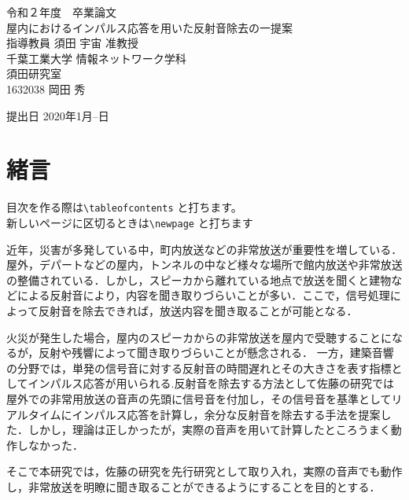 \documentclass[a4j,12pt]{jarticle}
\begin{document}
\begin{center}
\thispagestyle{empty}
\vspace*{5zh}
\huge
令和２年度　卒業論文\\[50pt]
{\Huge 屋内におけるインパルス応答を用いた反射音除去の一提案}\\
[80pt]
\huge
指導教員 須田 宇宙 准教授\\[30pt]
千葉工業大学 情報ネットワーク学科\\[10pt]
須田研究室\\[60pt]
1632038 \hspace{70pt} 岡田 秀\\[75pt]
\end{center}
\vspace*{-2cm}
\begin{flushright} 
\huge
提出日 2020年1月--日
\end{flushright}

\newpage
{}
\tableofcontents
\newpage
{}
\section{緒言}
目次を作る際は\verb+\tableofcontents+ と打ちます。\\
新しいページに区切るときは\verb+\newpage+ と打ちます

近年，災害が多発している中，町内放送などの非常放送が重要性を増している．屋外，デパートなどの屋内，トンネルの中など様々な場所で館内放送や非常放送の整備されている．しかし，スピーカから離れている地点で放送を聞くと建物などによる反射音により，内容を聞き取りづらいことが多い．ここで，信号処理によって反射音を除去できれば，放送内容を聞き取ることが可能となる．

火災が発生した場合，屋内のスピーカからの非常放送を屋内で受聴することになるが，反射や残響によって聞き取りづらいことが懸念される．
一方，建築音響の分野では，単発の信号音に対する反射音の時間遅れとその大きさを表す指標としてインパルス応答が用いられる.反射音を除去する方法として佐藤\cite{oka1}の研究では屋外での非常用放送の音声の先頭に信号音を付加し，その信号音を基準としてリアルタイムにインパルス応答を計算し，余分な反射音を除去する手法を提案した．しかし，理論は正しかったが，実際の音声を用いて計算したところうまく動作しなかった．

そこで本研究では，佐藤\cite{oka1}の研究を先行研究として取り入れ，実際の音声でも動作し，非常放送を明瞭に聞き取ることができるようにすることを目的とする．

\newpage
\end{document}

